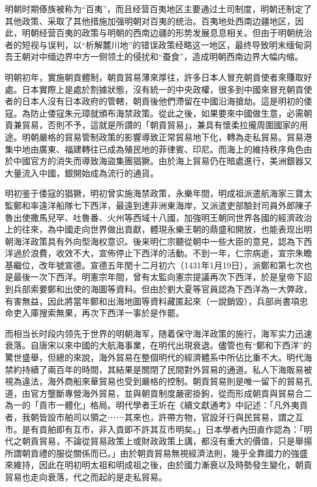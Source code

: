 明朝时期傣族被称为“百夷”，而且经营百夷地区主要通过土司制度，明朝还制定了其他政策、采取了其他措施加强明朝对百夷的统治。百夷地处西南边疆地区，因此，明朝经营百夷的政策与明朝的西南边疆的形势发展息息相关。但由于明朝统治者的短视与误判，以“析解麓川地”的错误政策经略这一地区，最终导致明末缅甸洞吾王朝对中缅边界中方一侧领土的侵扰和“蚕食”，造成明朝西南边界大幅内缩。

明朝初年，實施朝貢體制，朝貢貿易薄來厚往，許多日本人冒充朝貢使者來賺取好處。日本實際上是處於割據狀態，沒有統一的中央政權，很多到中國來冒充朝貢使者的日本人沒有日本政府的管轄，朝貢後他們滯留在中國沿海搶劫。這是明初的倭寇。為防止倭寇朱元璋就頒布海禁政策。從此之後，如果要來中國做生意，必需朝貢兼貿易，否則不予，這就是所謂的「朝貢貿易」，兼具有懷柔拉攏周圍國家的用途。明朝嚴格的貿易管制政策的影響導致正常貿易地下化，轉為走私貿易。貿易港集中地由廣東、福建轉往已成為殖民地的菲律賓、印尼。而海上的維持秩序角色由於中國官方的消失而導致海盜集團猖獗。由於海上貿易仍在暗處進行，美洲銀器又大量流入中國，銀開始成為流行的通貨。

明初鉴于倭寇的猖獗，明初曾实施海禁政策，永樂年間，明成祖派遣航海家三寶太監鄭和率遠洋船隊七下西洋，最遠到達非洲東海岸，又派遣吏部驗封司員外郎陳子魯出使撒馬兒罕、吐魯番、火州等西域十八國，加強明王朝同世界各國的經濟政治上的往來，為中國走向世界做出貢獻，體現永樂王朝的鼎盛和開放，也能表现出明朝海洋政策具有外向型海权意识。後来明仁宗聽從朝中一些大臣的意見，認為下西洋過於浪費，收效不大，宣佈停止下西洋的活動。不到一年，仁宗病逝，宣宗朱瞻基繼位，改年號宣德。宣德五年閏十二月初六（1431年1月19日），派鄭和第七次也是最後一次下西洋。明憲宗年間，曾有太監向憲宗提議再次下西洋，於是皇帝下詔到兵部索要鄭和出使的海圖等資料。但由於劉大夏等官員認為下西洋為一大弊政，有害無益，因此將當年鄭和出海地圖等資料藏匿起來（一說銷毀），兵部尚書項忠命吏入庫搜索無果，再次下西洋一事於是作罷。

而相当长时段内领先于世界的明朝海军，随着保守海洋政策的施行，海军实力迅速衰落。自唐宋以來中國的大航海事業，在明代出現衰退。儘管也有“鄭和下西洋”的驚世盛舉，但總的來說，海外貿易在整個明代的經濟體系中所佔比重不大。明代海禁約持續了兩百年的時間，其結果是關閉了民間對外貿易的通道。私人下海販易被視為違法，海外商船來華貿易也受到嚴格的控制。朝貢貿易則是唯一留下的貿易孔道，由官方壟斷專營海外貿易，並與朝貢制度嚴密掛鉤，從而形成朝貢與貿易合二為一的「貢市一體化」格局。明代學者王圻在《續文獻通考》中記述：「凡外夷貢者，我朝皆設市舶司以領之⋯⋯其來也，許帶方物，官設牙行與民貿易，謂之互市。是有貢舶即有互市，非入貢即不許其互市明矣。」日本學者內田直作認為：「明代之朝貢貿易，不論從貿易政策上或財政政策上講，都沒有重大的價值，只是舉揚所謂朝貢禮的服從關係而已。」由於朝貢貿易無視經濟法則，幾乎全靠國力的強盛來維持，因此在明初明太祖和明成祖之後，由於國力漸衰以及時勢發生變化，朝貢貿易也走向衰落，代之而起的是走私貿易。

